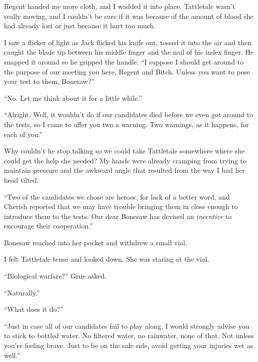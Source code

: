 Regent handed me more cloth, and I wadded it into place.  Tattletale wasn't really moving, and I couldn't be sure if it was because of the amount of blood she had already lost or just because it hurt too much.



I saw a flicker of light as Jack flicked his knife out, tossed it into the air and then caught the blade tip between his middle finger and the nail of his index finger.  He snapped it around so he gripped the handle.  ``I suppose I should get around to the purpose of our meeting you here, Regent and Bitch.  Unless you want to pose your test to them, Bonesaw?''



``No.  Let me think about it for a little while.''



``Alright.  Well, it wouldn't do if our candidates died before we even got around to the tests, so I came to offer you two a warning.  Two warnings, as it happens, for each of you.''



Why couldn't he stop talking so we could take Tattletale somewhere where she could get the help she needed?  My hands were already cramping from trying to maintain pressure and the awkward angle that resulted from  the way I had her head tilted.



``Two of the candidates we chose are heroes, for lack of a better word, and Cherish reported that we may have trouble bringing them in close enough to introduce them to the tests.  Our dear Bonesaw has devised an \emph{incentive }to encourage their cooperation.''



Bonesaw reached into her pocket and withdrew a small vial.



I felt Tattletale tense and looked down.  She was staring at the vial.



``Biological warfare?'' Grue asked.



``Naturally.''



``What does it do?''



``Just in case all of our candidates fail to play along, I would strongly advise you to stick to bottled water.  No filtered water, no rainwater, none of that.  Not unless you're feeling brave.  Just to be on the safe side, avoid getting your injuries wet as well.''




